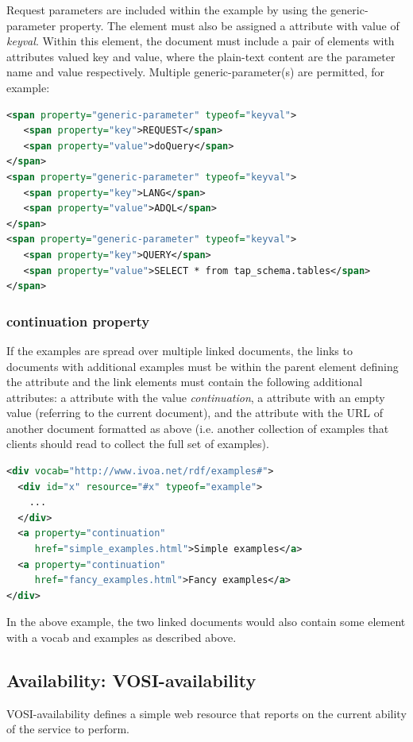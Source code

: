 \documentclass[11pt,letter]{ivoa}
\begin{document}
Request parameters are included within the example by using the
generic-parameter property. The element must also be assigned a
 attribute
with value of \emph{keyval}. Within this element, the document must include a pair of
elements with  attributes valued key and value, where the plain-text content are
the parameter name and value respectively. Multiple generic-parameter(s) are
permitted, for example:

\begin{lstlisting}[language=XML]
<span property="generic-parameter" typeof="keyval">
   <span property="key">REQUEST</span>
   <span property="value">doQuery</span>
</span>
<span property="generic-parameter" typeof="keyval">
   <span property="key">LANG</span>
   <span property="value">ADQL</span>
</span>
<span property="generic-parameter" typeof="keyval">
   <span property="key">QUERY</span>
   <span property="value">SELECT * from tap_schema.tables</span>
</span>
\end{lstlisting}

\subsubsection{continuation property}

If the examples are spread over multiple linked documents, the links to
documents with additional examples must be within the parent element defining
the  attribute and the link elements must contain the following additional
attributes:  a  attribute with the value
\emph{continuation}, a 
attribute with an empty value (referring to the current document), and
the 
attribute with the URL of another document formatted as above (i.e. another
collection of examples that clients should read to collect the full set of
examples).

\begin{lstlisting}[language=XML,basicstyle=\footnotesize]
<div vocab="http://www.ivoa.net/rdf/examples#">
  <div id="x" resource="#x" typeof="example">
    ...
  </div>
  <a property="continuation"
     href="simple_examples.html">Simple examples</a>
  <a property="continuation"
     href="fancy_examples.html">Fancy examples</a>
</div>
\end{lstlisting}

In the above example, the two linked documents would also contain some element
with a vocab and examples as described above.

\subsection{Availability: VOSI-availability}
\label{sec:vosi-availability}
VOSI-availability \citep{2017ivoa.spec.0524G} defines a simple web resource that
reports on the current ability of the service to perform.
\end{document}
